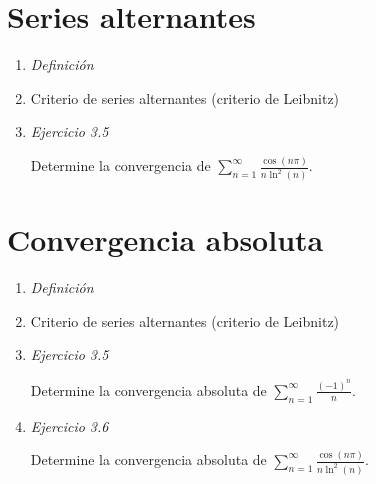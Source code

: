 \documentclass[12pt,oneside]{book}
\begin{document}
\newpage

\section{Series alternantes}

\begin{enumerate}


 \item \textit{Definición}
 
  \vspace{100pt}
  
  
  \item Criterio de series alternantes (criterio de Leibnitz)
  
 
  \vspace{100pt}
  
  
  \item \textit{Ejercicio 3.5}
  
    Determine la convergencia de $\displaystyle \sum_{n=1}^{\infty} \frac{\cos(n\pi)}{n\ln^2(n)} $.


\end{enumerate}
    
\newpage
    
\section{Convergencia absoluta}

\begin{enumerate}


 \item \textit{Definición}
 
  \vspace{100pt}
  
  
  \item Criterio de series alternantes (criterio de Leibnitz)
  
 
  \vspace{100pt}
  
  
  \item \textit{Ejercicio 3.5}
  
    Determine la convergencia absoluta de $\displaystyle \sum_{n=1}^{\infty} \frac{(-1)^{n}}{n} $.

  \vspace{100pt}
  
  
  \item \textit{Ejercicio 3.6}
  
    Determine la convergencia absoluta de $\displaystyle \sum_{n=1}^{\infty} \frac{\cos(n\pi)}{n\ln^2(n)} $.

\end{enumerate}
\end{document}
